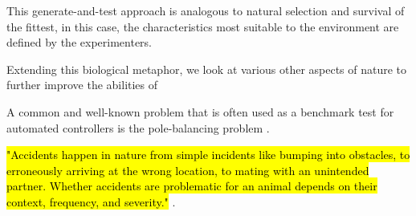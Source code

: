 This generate-and-test approach is analogous to natural selection and survival of the fittest, in this case, the characteristics most suitable to the environment are defined by the experimenters.

Extending this biological metaphor, we look at various other aspects of nature to further improve the abilities of 



A common and well-known problem that is often used as a benchmark test for automated controllers is the pole-balancing problem \cite{Stanley2004}.










\hl{"Accidents happen in nature from simple incidents like bumping into obstacles, to erroneously arriving at the wrong location, to mating with an unintended partner. Whether accidents are problematic for an animal depends on their context, frequency, and severity."} \cite{ferreira2018accidental}.

